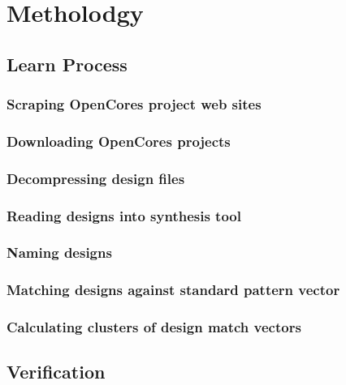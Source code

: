 
\section{Metholodgy}

\subsection{Learn Process}

\subsubsection{Scraping OpenCores project web sites} 
\subsubsection{Downloading OpenCores projects}
\subsubsection{Decompressing design files} 
\subsubsection{Reading designs into synthesis tool} 
\subsubsection{Naming designs} 
\subsubsection{Matching designs against standard pattern vector}
\subsubsection{Calculating clusters of design match vectors}

\subsection{Verification}